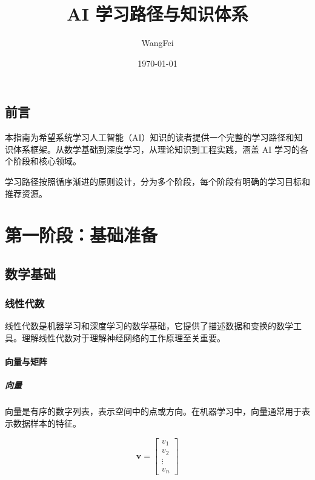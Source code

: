 \documentclass[12pt,UTF8]{ctexbook}
\title{\heiti\zihao{0} AI 学习路径与知识体系}
\author{WangFei}
\date{\today}
\begin{document}
\maketitle
\tableofcontents

\frontmatter
\chapter{前言}

本指南为希望系统学习人工智能（AI）知识的读者提供一个完整的学习路径和知识体系框架。从数学基础到深度学习，从理论知识到工程实践，涵盖 AI 学习的各个阶段和核心领域。

学习路径按照循序渐进的原则设计，分为多个阶段，每个阶段有明确的学习目标和推荐资源。

\mainmatter

\part{第一阶段：基础准备}

\chapter{数学基础}
\label{chap:math_foundation}

\section{线性代数}
\label{sec:linear_algebra}

线性代数是机器学习和深度学习的数学基础，它提供了描述数据和变换的数学工具。理解线性代数对于理解神经网络的工作原理至关重要。

\subsection{向量与矩阵}

\subsubsection{向量}

向量是有序的数字列表，表示空间中的点或方向。在机器学习中，向量通常用于表示数据样本的特征。

$$\mathbf{v} = \begin{bmatrix} v_1 \\ v_2 \\ \vdots \\ v_n \end{bmatrix}$$
\end{document}
